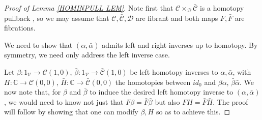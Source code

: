 \documentclass[a4paper,10pt
 ,final
]{article}%
\numberwithin{equation}{section}
\numberwithin{figure}{section}
\theoremstyle{definition} %
\newcommand{\V}{\ensuremath{\mathcal V}}
\newcommand{\1}{\ensuremath{\mathbbm 1}}%
\begin{document}
\begin{proof}[Proof of Lemma \ref{HOMINPULL LEM}]
	Note first that
	$\mathcal{C} \times_{\mathcal{D}}\bar{\mathcal{C}}$
	is a homotopy pullback
	\cite[Prop. A.2.4.4]{Lur09},
	so we may assume that
	$\mathcal{C},\bar{\mathcal{C}},\mathcal{D}$
	are fibrant and both maps $F,\bar{F}$ are fibrations.
	
	We need to show that $(\alpha,\bar{\alpha})$
	admits left and right inverses up to homotopy.
	By symmetry, we need only address the left inverse case.
	
	Let
	$\beta \colon 1_{\V} \to \mathcal{C}(1,0)$,
	$\bar{\beta} \colon 1_{\V} \to \bar{\mathcal{C}}(1,0)$
	be left homotopy inverses to $\alpha,\bar{\alpha}$,
	with 
	$H \colon \mathbb{C} \to \mathcal{C}(0,0)$,
	$\bar{H} \colon \mathbb{C} \to \bar{\mathcal{C}}(0,0)$
	the homotopies between 
	$id_0$ and $\beta\alpha$, $\bar{\beta}\bar{\alpha}$.
	We now note that, for $\beta$ and $\bar{\beta}$ to induce the desired 
	left homotopy inverse to 
	$(\alpha,\bar{\alpha})$,
	we would need to know not just that 
	$F\beta=\bar{F}\bar{\beta}$
	but also 
	$FH=\bar{F}\bar{H}$.
	The proof will follow by showing that one can modify 
	$\beta,H$ so as to achieve this.
	

\end{proof}
\end{document}
